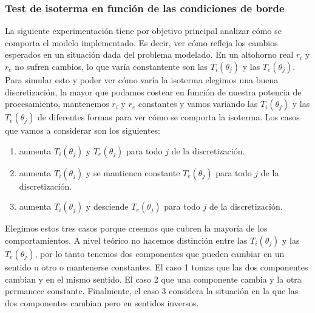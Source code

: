 \subsubsection{Test de isoterma en función de las condiciones de borde}
La siguiente experimentación tiene por objetivo principal analizar cómo se comporta el modelo implementado. Es decir, ver cómo refleja los cambios esperados en un situación dada del problema modelado.
En un altohorno real $r_i$ y $r_e$ no sufren cambios, lo que varía constantente son las $T_i(\theta_j)$ y las $T_e(\theta_j)$. Para simular esto y poder ver cómo varía la isoterma elegimos una buena discretización, la mayor que podamos costear en función de nuestra potencia de procesamiento, mantenemos $r_i$ y $r_e$ constantes y vamos variando las $T_i(\theta_j)$ y las $T_e(\theta_j)$ de diferentes formas para ver cómo se comporta la isoterma.
Los casos que vamos a considerar son los siguientes:
\begin{enumerate}
 \item aumenta $T_i(\theta_j)$ y $T_e(\theta_j)$ para todo $j$ de la discretización.
 \item aumenta $T_i(\theta_j)$ y se mantienen constante $T_e(\theta_j)$ para todo $j$ de la discretización.
 \item aumenta $T_i(\theta_j)$ y desciende $T_e(\theta_j)$ para todo $j$ de la discretización.
\end{enumerate}
Elegimos estos tres casos porque creemos que cubren la mayoría de los comportamientos. A nivel teórico no hacemos distinción entre las $T_i(\theta_j)$ y las $T_e(\theta_j)$, por lo tanto tenemos dos componentes que pueden cambiar en un sentido u otro o mantenerse constantes. El caso 1 tomas que las dos componentes cambian y en el mismo sentido. El caso 2 que una componente cambia y la otra permanece constante. Finalmente, el caso 3 considera la situación en la que las dos componentes cambian pero en sentidos inversos.
